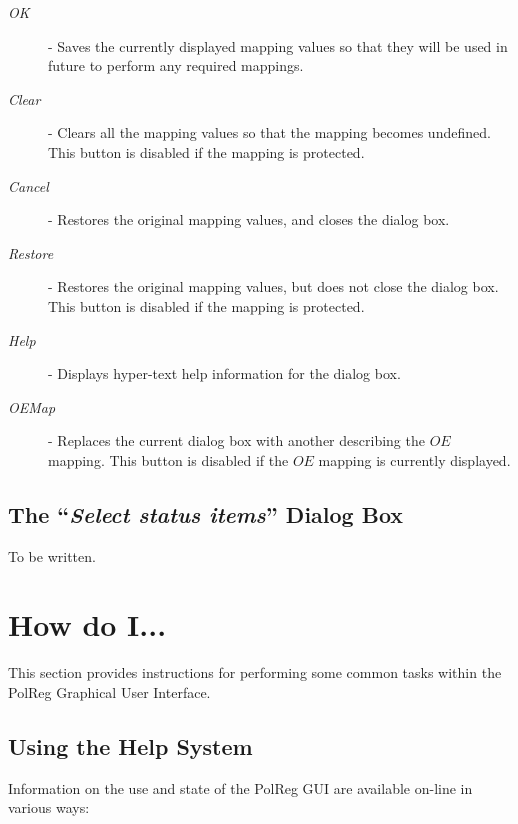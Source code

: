 \begin{description}
\item [{\em OK}] - Saves the currently displayed mapping values so that
they will be used in future to perform any required mappings. 
\item [{\em Clear}] - Clears all the mapping values so that the mapping
becomes undefined. This button is disabled if the mapping is protected.
\item [{\em Cancel}] - Restores the original mapping values, and closes
the dialog box.
\item [{\em Restore}] - Restores the original mapping values, but does not
close the dialog box. This button is disabled if the mapping is protected.
\item [{\em Help}] - Displays hyper-text help information for the dialog
box.
\item [{\em OEMap}] - Replaces the current dialog box with another
describing the $OE$ mapping. This button is disabled if the $OE$ mapping
is currently displayed.
\end{description}

\subsection {The ``{\em Select status items}'' Dialog Box}
To be written.

\section {How do I...}
This section provides instructions for performing some common tasks
within the PolReg Graphical User Interface.

\subsection {Using the Help System}
Information on the use and state of the PolReg GUI are available on-line
in various ways:

